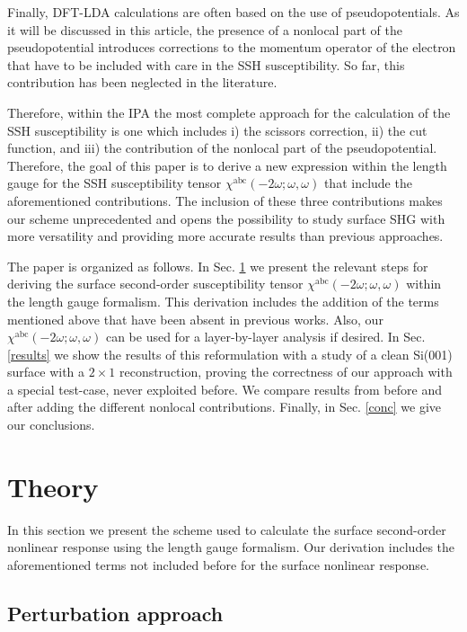 \documentclass[floatfix,prb,aps,superscriptaddress,11pt,preprint,letterpaper]{revtex4}
\begin{document}
Finally, DFT-LDA calculations are often based on the use of pseudopotentials.
As it will be discussed 
in this article, the presence of a nonlocal part of the
pseudopotential introduces
corrections to
the momentum operator of the electron that have to be included with care in 
the SSH susceptibility. So far, this contribution has been neglected in the 
literature.

Therefore, within the IPA the most complete approach for the calculation of 
the SSH susceptibility is one which includes i) the scissors correction, 
ii) the cut function, and iii) the contribution of the nonlocal part of the 
pseudopotential. Therefore, the goal of this paper is to derive a new 
expression within the length gauge for the SSH susceptibility tensor 
$\chi^{\mathrm{a}\mathrm{b}\mathrm{c}}(-2\omega;\omega,\omega)$ 
that include the aforementioned contributions. The inclusion of these three 
contributions makes our scheme unprecedented and opens the possibility to 
study surface SHG with more versatility and providing more accurate results 
than previous approaches. 

The paper is organized as follows. In Sec. \ref{theory} we present the 
relevant steps for deriving the surface second-order susceptibility tensor
$\chi^{\mathrm{a}\mathrm{b}\mathrm{c}}(-2\omega;\omega,\omega)$ within the 
length gauge formalism. This derivation includes the addition of the terms 
mentioned above that have been absent in previous works. Also, our 
$\chi^{\mathrm{a}\mathrm{b}\mathrm{c}}(-2\omega;\omega,\omega)$ can be used 
for a layer-by-layer analysis if desired. In Sec. \ref{results} we show the 
results of this reformulation with a study of a clean Si(001) surface with a 
$2 \times 1$ reconstruction, 
proving the correctness of our approach with a special test-case,
never exploited before.
We compare results from before and after adding 
the different nonlocal contributions. Finally, in Sec. \ref{conc} we give 
our conclusions.

\section{Theory}

\label{theory}

In this section we present the scheme used to calculate the surface second-order
nonlinear response using the length gauge formalism.
Our derivation includes the aforementioned terms not included
before for the surface nonlinear
response. 

\subsection{Perturbation approach}
\end{document}
